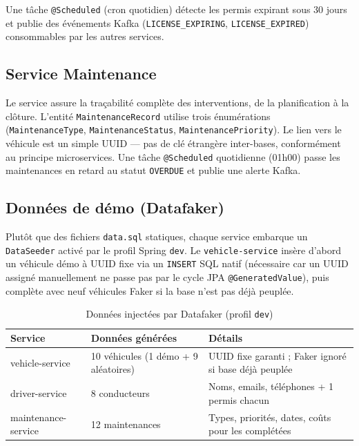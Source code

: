 \documentclass[12pt,a4paper]{article}
\begin{document}
Une t\^{a}che \texttt{@Scheduled} (cron quotidien) d\'{e}tecte les permis expirant sous 30 jours et publie des \'{e}v\'{e}nements Kafka (\texttt{LICENSE\_EXPIRING}, \texttt{LICENSE\_EXPIRED}) consommables par les autres services.

\subsection{Service Maintenance}

Le service assure la tra\c{c}abilit\'{e} compl\`{e}te des interventions, de la planification \`{a} la cl\^{o}ture. L'entit\'{e} \texttt{MaintenanceRecord} utilise trois \'{e}num\'{e}rations (\texttt{MaintenanceType}, \texttt{MaintenanceStatus}, \texttt{MaintenancePriority}). Le lien vers le v\'{e}hicule est un simple UUID --- pas de cl\'{e} \'{e}trang\`{e}re inter-bases, conform\'{e}ment au principe microservices. Une t\^{a}che \texttt{@Scheduled} quotidienne (01h00) passe les maintenances en retard au statut \texttt{OVERDUE} et publie une alerte Kafka.

\subsection{Donn\'{e}es de d\'{e}mo (Datafaker)}

Plut\^{o}t que des fichiers \texttt{data.sql} statiques, chaque service embarque un \texttt{DataSeeder} activ\'{e} par le profil Spring \texttt{dev}. Le \texttt{vehicle-service} ins\`{e}re d'abord un v\'{e}hicule d\'{e}mo \`{a} UUID fixe via un \texttt{INSERT} SQL natif (n\'{e}cessaire car un UUID assign\'{e} manuellement ne passe pas par le cycle JPA \texttt{@GeneratedValue}), puis compl\`{e}te avec neuf v\'{e}hicules Faker si la base n'est pas d\'{e}j\`{a} peupl\'{e}e.

\begin{table}[H]
\centering\small
\begin{tabular}{|l|l|l|}
  \hline
  \rowcolor{primary!15}
  \textbf{Service} & \textbf{Donn\'{e}es g\'{e}n\'{e}r\'{e}es} & \textbf{D\'{e}tails} \\
  \hline
  vehicle-service & 10 v\'{e}hicules (1 d\'{e}mo + 9 al\'{e}atoires) & UUID fixe garanti ; Faker ignor\'{e} si base d\'{e}j\`{a} peupl\'{e}e \\
  \hline
  driver-service & 8 conducteurs & Noms, emails, t\'{e}l\'{e}phones + 1 permis chacun \\
  \hline
  maintenance-service & 12 maintenances & Types, priorit\'{e}s, dates, co\^{u}ts pour les compl\'{e}t\'{e}es \\
  \hline
\end{tabular}
\caption{Donn\'{e}es inject\'{e}es par Datafaker (profil \texttt{dev})}
\end{table}
\end{document}
